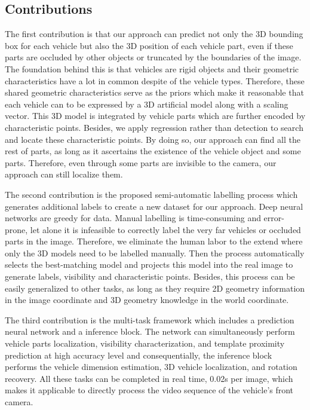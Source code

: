 \subsection{Contributions}

The first contribution is that our approach can predict not only the 3D bounding box for each vehicle but also the 3D position of each vehicle part, even if these parts are occluded by other objects or truncated by the boundaries of the image. The foundation behind this is that vehicles are rigid objects and their geometric characteristics have a lot in common despite of the vehicle types. Therefore, these shared geometric characteristics serve as the priors which make it reasonable that each vehicle can to be expressed by a 3D artificial model along with a scaling vector. This 3D model is integrated by vehicle parts which are further encoded by characteristic points. Besides, we apply regression rather than detection to search and locate these characteristic points. By doing so, our approach can find all the rest of parts, as long as it ascertains the existence of the vehicle object and some parts. Therefore, even through some parts are invisible to the camera, our approach can still localize them. 

The second contribution is the proposed semi-automatic labelling process which generates additional labels to create a new dataset for our approach.  Deep neural networks are greedy for data. Manual labelling is time-consuming and error-prone, let alone it is infeasible to correctly label the very far vehicles or occluded parts in the image. Therefore, we eliminate the human labor to the extend where only the 3D models need to be labelled manually. Then the process automatically selects the best-matching model and projects this model into the real image to generate labels, \eg visibility and characteristic points.  Besides, this process can be easily generalized to other tasks, as long as they require 2D geometry information in the image coordinate and 3D geometry knowledge in the world coordinate.

The third contribution is the multi-task framework which includes a prediction neural network and a inference block. The network can simultaneously perform vehicle parts localization, visibility characterization, and template proximity prediction at high accuracy level and consequentially, the inference block performs the vehicle dimension estimation,  3D vehicle localization, and rotation recovery. All these tasks can be completed in real time, 0.02s per image, which makes it applicable to directly process the video sequence of the vehicle's front camera.